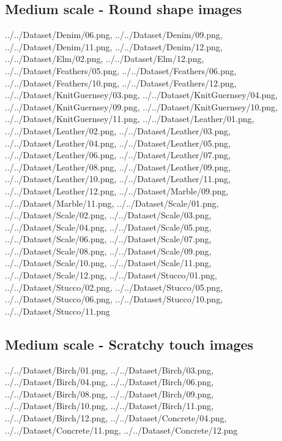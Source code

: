 \subsection{Medium scale - Round shape images}
{../../Dataset/Denim/06.png,
../../Dataset/Denim/09.png,
../../Dataset/Denim/11.png,
../../Dataset/Denim/12.png,
../../Dataset/Elm/02.png,
../../Dataset/Elm/12.png,
../../Dataset/Feathers/05.png,
../../Dataset/Feathers/06.png,
../../Dataset/Feathers/10.png,
../../Dataset/Feathers/12.png,
../../Dataset/KnitGuernsey/03.png,
../../Dataset/KnitGuernsey/04.png,
../../Dataset/KnitGuernsey/09.png,
../../Dataset/KnitGuernsey/10.png,
../../Dataset/KnitGuernsey/11.png,
../../Dataset/Leather/01.png,
../../Dataset/Leather/02.png,
../../Dataset/Leather/03.png,
../../Dataset/Leather/04.png,
../../Dataset/Leather/05.png,
../../Dataset/Leather/06.png,
../../Dataset/Leather/07.png,
../../Dataset/Leather/08.png,
../../Dataset/Leather/09.png,
../../Dataset/Leather/10.png,
../../Dataset/Leather/11.png,
../../Dataset/Leather/12.png,
../../Dataset/Marble/09.png,
../../Dataset/Marble/11.png,
../../Dataset/Scale/01.png,
../../Dataset/Scale/02.png,
../../Dataset/Scale/03.png,
../../Dataset/Scale/04.png,
../../Dataset/Scale/05.png,
../../Dataset/Scale/06.png,
../../Dataset/Scale/07.png,
../../Dataset/Scale/08.png,
../../Dataset/Scale/09.png,
../../Dataset/Scale/10.png,
../../Dataset/Scale/11.png,
../../Dataset/Scale/12.png,
../../Dataset/Stucco/01.png,
../../Dataset/Stucco/02.png,
../../Dataset/Stucco/05.png,
../../Dataset/Stucco/06.png,
../../Dataset/Stucco/10.png,
../../Dataset/Stucco/11.png}

\newpage
\subsection{Medium scale - Scratchy touch images}
{../../Dataset/Birch/01.png,
../../Dataset/Birch/03.png,
../../Dataset/Birch/04.png,
../../Dataset/Birch/06.png,
../../Dataset/Birch/08.png,
../../Dataset/Birch/09.png,
../../Dataset/Birch/10.png,
../../Dataset/Birch/11.png,
../../Dataset/Birch/12.png,
../../Dataset/Concrete/04.png,
../../Dataset/Concrete/11.png,
../../Dataset/Concrete/12.png}

\newpage
